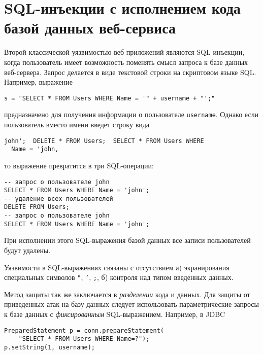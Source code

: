 \section[SQL-инъекции с исполнением кода веб-сервером]{SQL-инъекции с исполнением кода \protect\\ базой данных веб-сервиса}

Второй классической уязвимостью веб-приложений являются SQL-инъекции, когда пользователь имеет возможность поменять смысл запроса к базе данных веб-сервера. Запрос делается в виде текстовой строки на скриптовом языке SQL.  Например, выражение
\begin{verbatim}
s = "SELECT * FROM Users WHERE Name = '" + username + "';"
\end{verbatim}
предназначено для получения информации о пользователе \texttt{username}. Однако если пользователь вместо имени введет строку вида
\begin{center} \begin{verbatim}
john';  DELETE * FROM Users;  SELECT * FROM Users WHERE
  Name = 'john,
\end{verbatim} \end{center}
то выражение превратится в три SQL-операции:
\begin{verbatim}
-- запрос о пользователе john
SELECT * FROM Users WHERE Name = 'john';
-- удаление всех пользователей
DELETE FROM Users;
-- запрос о пользователе john
SELECT * FROM Users WHERE Name = 'john';
\end{verbatim}
При исполнении этого SQL-выражения базой данных все записи пользователей будут удалены.

Уязвимости в SQL-выражениях связаны с отсутствием а) экранирования специальных символов \texttt{"},  \texttt{'},  \texttt{;}, б) контроля над типом введенных данных.

Метод защиты так же заключается в \emph{разделении} кода и данных. Для защиты от приведенных атак на базу данных следует использовать параметрические запросы к базе данных с \emph{фиксированным} SQL-выражением. Например, в JDBC
\begin{verbatim}
PreparedStatement p = conn.prepareStatement(
    "SELECT * FROM Users WHERE Name=?");
p.setString(1, username);
\end{verbatim}
